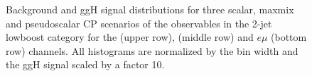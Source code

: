\begin{figure}[h!]
\begin{subfigure}{.3\textwidth}
    \end{subfigure}%
    \caption{Background and ggH signal distributions for three scalar, maxmix and pseudoscalar CP scenarios of the observables in the 2-jet lowboost category for the \mutau{} (upper row), \etau (middle row) and $e\mu$ (bottom row) channels. 
    All histograms are normalized by the bin width and the ggH signal scaled by a factor 10.}\label{Supplement:ES:controlplots:2jet_lowboost}  
\end{figure}%
\clearpage
